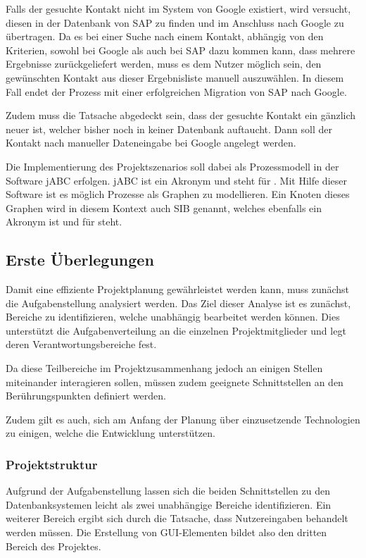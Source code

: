 Falls der gesuchte Kontakt nicht im System von Google existiert, wird versucht, diesen in der Datenbank
 von SAP zu finden und im Anschluss nach Google zu übertragen.
Da es bei einer Suche nach einem Kontakt, abhängig von den Kriterien, sowohl bei Google als auch bei SAP
 dazu kommen kann, dass mehrere Ergebnisse zurückgeliefert werden, muss es dem Nutzer möglich sein, den
 gewünschten Kontakt aus dieser Ergebnisliste manuell auszuwählen.
In diesem Fall endet der Prozess mit einer erfolgreichen Migration von SAP nach Google.

Zudem muss die Tatsache abgedeckt sein, dass der gesuchte Kontakt ein gänzlich neuer ist, welcher bisher
 noch in keiner Datenbank auftaucht. Dann soll der Kontakt nach manueller Dateneingabe bei Google angelegt werden.
 
Die Implementierung des Projektszenarios soll dabei als Prozessmodell in der Software jABC erfolgen. jABC ist ein Akronym und steht für . Mit Hilfe dieser Software ist es möglich Prozesse als Graphen zu modellieren. Ein Knoten dieses Graphen wird in diesem Kontext auch SIB genannt, welches ebenfalls ein Akronym ist und für  steht.

\subsection{Erste Überlegungen}
Damit eine effiziente Projektplanung gewährleistet werden kann, muss zunächst die Aufgabenstellung
 analysiert werden.
Das Ziel dieser Analyse ist es zunächst, Bereiche zu identifizieren, welche unabhängig bearbeitet werden können.
Dies unterstützt die Aufgabenverteilung an die einzelnen Projektmitglieder und legt deren Verantwortungsbereiche fest.

Da diese Teilbereiche im Projektzusammenhang jedoch an einigen Stellen miteinander interagieren sollen, müssen
 zudem geeignete Schnittstellen an den Berührungspunkten definiert werden.
 
Zudem gilt es auch, sich am Anfang der Planung über einzusetzende Technologien zu einigen, welche die Entwicklung unterstützen.

\subsubsection{Projektstruktur}
Aufgrund der Aufgabenstellung lassen sich die beiden Schnittstellen zu den Datenbanksystemen leicht als zwei
 unabhängige Bereiche identifizieren.
Ein weiterer Bereich ergibt sich durch die Tatsache, dass Nutzereingaben behandelt werden müssen.
Die Erstellung von GUI-Elementen bildet also den dritten Bereich des Projektes.

